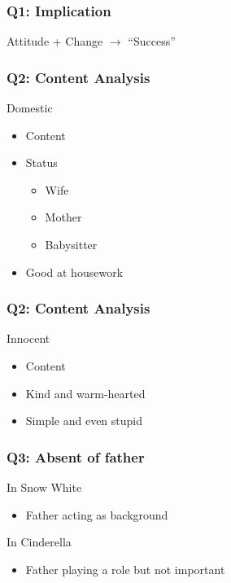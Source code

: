 \documentclass{beamer}
\begin{document}
\begin{frame}
    \frametitle{Q1: Implication}
    \huge{Attitude + Change $\rightarrow$ ``Success''}
\end{frame}

\begin{frame}
    \frametitle{Q2: Content Analysis}
    \begin{block}{Domestic}
        \begin{itemize}
            \item Content
            \item Status
                  \begin{itemize}
                      \item Wife
                      \item Mother
                      \item Babysitter
                  \end{itemize}
            \item Good at housework
        \end{itemize}
    \end{block}
\end{frame}

\begin{frame}
    \frametitle{Q2: Content Analysis}
    \begin{block}{Innocent}
        \begin{itemize}
            \item Content
            \item Kind and warm-hearted
            \item Simple and even stupid
        \end{itemize}
    \end{block}
\end{frame}

\begin{frame}
    \frametitle{Q3: Absent of father}
    \begin{block}{In Snow White}
        \begin{itemize}
            \item Father acting as background
        \end{itemize}
    \end{block}
    \begin{block}{In Cinderella}
        \begin{itemize}
            \item Father playing a role but not important
        \end{itemize}
    \end{block}
\end{frame}
\end{document}
